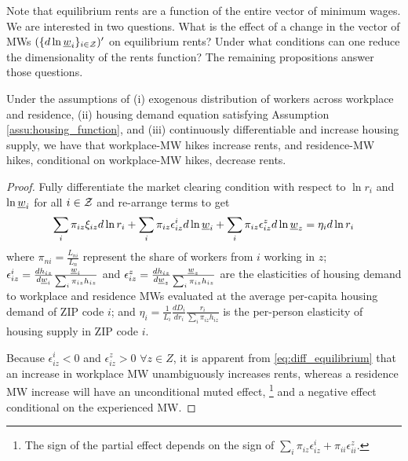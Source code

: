 Note that equilibrium rents are a function of the entire vector of minimum wages. 
We are interested in two questions. What is the effect of a change in the vector of 
MWs $(\{d \ln \underline{w}_i\}_{i\in\mathcal{Z}})'$ on equilibrium rents?
Under what conditions can one reduce the dimensionality of the rents function?
The remaining propositions answer those questions.

\begin{prop}\label{prop:comparative_statics}
	Under the assumptions of (i) exogenous distribution of workers across workplace 
	and residence, (ii) housing demand equation satisfying Assumption 
	\ref{assu:housing_function}, and (iii) continuously differentiable and increase 
	housing supply, we have that workplace-MW hikes increase rents, and residence-MW 
	hikes, conditional on workplace-MW hikes, decrease rents.
\end{prop}

\begin{proof}
	Fully differentiate the market clearing condition with respect to $\ln r_i$ and 
	$\ln \underline{w}_i$ for all $i\in\mathcal{Z}$ and re-arrange terms to get
	\begin{equation}\label{eq:diff_equilibrium}
		\sum_i \pi_{iz} \xi_{iz} d \ln r_i
		+ \sum_i \pi_{iz} \epsilon_{iz}^i d \ln \underline{w}_i 
		+ \sum_i \pi_{iz} \epsilon_{iz}^z d \ln \underline{w}_z
		= \eta_i d \ln r_i
	\end{equation}	
	where 
	$\pi_{ni} = \frac{L_{ni}}{L_n}$ represent the share of workers from $i$ working in 
	$z$;
	$\epsilon_{iz}^i = \frac{d h_{iz}}{d \underline{w}_i} \frac{\underline{w}_i}{\sum_i \pi_{iz} h_{iz}}$ and 
	$\epsilon_{iz}^z = \frac{d h_{iz}}{d \underline{w}_z} \frac{\underline{w}_z}{\sum_i \pi_{iz} h_{iz}}$ 
	are the elasticities of housing demand to workplace and residence MWs evaluated at 
	the average per-capita housing demand of ZIP code $i$; and
	$\eta_i = \frac{1}{L_i} \frac{d D_i}{d r_i} \frac{r_i}{\sum_i \pi_{iz} h_{iz}}$ is 
	the per-person elasticity of housing supply in ZIP code $i$.
	
	Because $\epsilon_{iz}^i < 0$ and $\epsilon_{iz}^z > 0$ $\forall z\in Z$, it is 
	apparent from \eqref{eq:diff_equilibrium} that an increase in workplace
	MW unambiguously increases rents, whereas a	residence MW increase will have an 
	unconditional muted effect,%
	\footnote{The sign of the partial effect depends on the sign of 
		$\sum_i \pi_{iz} \epsilon_{iz}^i + \pi_{ii} \epsilon_{ii}^z$.} 
	and a negative effect conditional on the experienced MW.
\end{proof}

